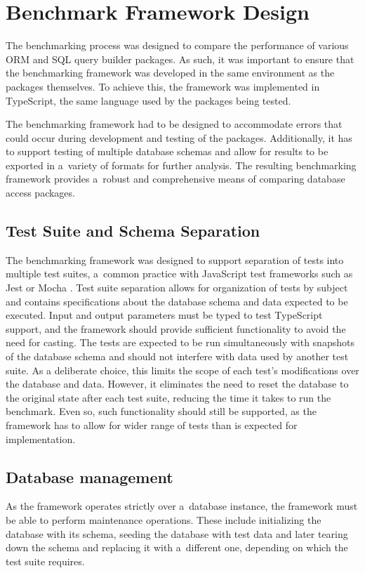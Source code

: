 \chapter{Benchmark Framework Design}\label{ch:benchmarkDesign}

The benchmarking process was designed to compare the performance of various ORM
and SQL query builder packages. As such, it was important to ensure that the
benchmarking framework was developed in the same environment as the packages
themselves. To achieve this, the framework was implemented in TypeScript, the
same language used by the packages being tested.

The benchmarking framework had to be designed to accommodate errors that could
occur during development and testing of the packages. Additionally, it has to
support testing of multiple database schemas and allow for results to be
exported in a~variety of formats for further analysis. The resulting
benchmarking framework provides a~robust and comprehensive means of comparing
database access packages.

\section{Test Suite and Schema Separation}

The benchmarking framework was designed to support separation of tests into
multiple test suites, a~common practice with JavaScript test frameworks such as
Jest \cite{Jest} or Mocha \cite{Mocha}. Test suite separation allows for
organization of tests by subject and contains specifications about the database
schema and data expected to be executed. Input and output parameters must be
typed to test TypeScript support, and the framework should provide sufficient
functionality to avoid the need for casting.
\newpage
The tests are expected to be run simultaneously with snapshots of the database
schema and should not interfere with data used by another test suite. As a
deliberate choice, this limits the scope of each test's modifications over the
database and data. However, it eliminates the need to reset the database to the
original state after each test suite, reducing the time it takes to run the
benchmark. Even so, such functionality should still be supported, as the
framework has to allow for wider range of tests than is expected for
implementation.

\section{Database management}
As the framework operates strictly over a~database instance, the framework must
be able to perform maintenance operations. These include initializing the
database with its schema, seeding the database with test data and later tearing
down the schema and replacing it with a~different one, depending on which the
test suite requires.

